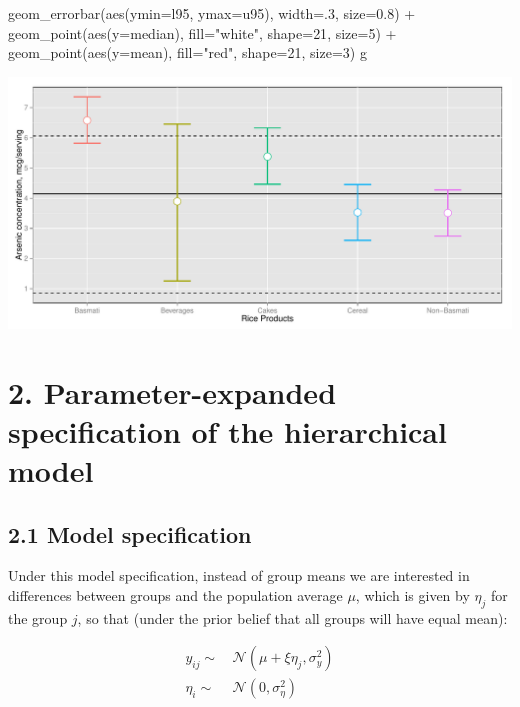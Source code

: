 \documentclass[]{article}
\newenvironment{Shaded}{\begin{snugshade}}{\end{snugshade}}
\newcommand{\KeywordTok}[1]{\textcolor[rgb]{0.94,0.87,0.69}{{#1}}}
\newcommand{\DataTypeTok}[1]{\textcolor[rgb]{0.87,0.87,0.75}{{#1}}}
\newcommand{\DecValTok}[1]{\textcolor[rgb]{0.86,0.86,0.80}{{#1}}}
\newcommand{\FloatTok}[1]{\textcolor[rgb]{0.75,0.75,0.82}{{#1}}}
\newcommand{\StringTok}[1]{\textcolor[rgb]{0.80,0.58,0.58}{{#1}}}
\newcommand{\NormalTok}[1]{\textcolor[rgb]{0.80,0.80,0.80}{{#1}}}
\begin{document}
\begin{Shaded}
\begin{Highlighting}[]
\StringTok{  }\KeywordTok{geom_errorbar}\NormalTok{(}\KeywordTok{aes}\NormalTok{(}\DataTypeTok{ymin=}\NormalTok{l95, }\DataTypeTok{ymax=}\NormalTok{u95), }\DataTypeTok{width=}\NormalTok{.}\DecValTok{3}\NormalTok{, }\DataTypeTok{size=}\FloatTok{0.8}\NormalTok{) +}
\StringTok{  }\KeywordTok{geom_point}\NormalTok{(}\KeywordTok{aes}\NormalTok{(}\DataTypeTok{y=}\NormalTok{median), }\DataTypeTok{fill=}\StringTok{"white"}\NormalTok{, }\DataTypeTok{shape=}\DecValTok{21}\NormalTok{, }\DataTypeTok{size=}\DecValTok{5}\NormalTok{)  +}
\StringTok{  }\KeywordTok{geom_point}\NormalTok{(}\KeywordTok{aes}\NormalTok{(}\DataTypeTok{y=}\NormalTok{mean), }\DataTypeTok{fill=}\StringTok{"red"}\NormalTok{, }\DataTypeTok{shape=}\DecValTok{21}\NormalTok{, }\DataTypeTok{size=}\DecValTok{3}\NormalTok{)}
\NormalTok{g}
\end{Highlighting}
\end{Shaded}

\includegraphics{markdown_hw3_files/figure-latex/unnamed-chunk-10-1.pdf}
\newpage \section{2. Parameter-expanded specification of the hierarchical model}
\subsection{2.1 Model specification} Under this model specification,
instead of group means we are interested in differences between groups
and the population average \(\mu\), which is given by \(\eta_j\) for the
group \(j\), so that (under the prior belief that all groups will have
equal mean):

\begin{align*}
  y_{ij} \sim& \, \mathcal{N}\left( \mu + \xi\eta_j, \sigma_y^2 \right)\\
  \eta_i \sim& \, \mathcal{N}\left( 0, \sigma_\eta^2 \right)
\end{align*}
\end{document}
